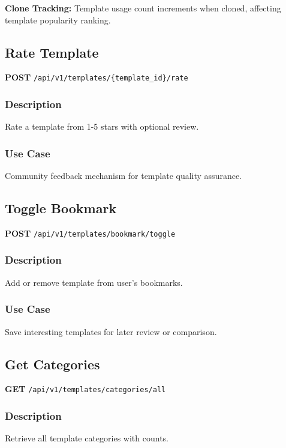 \documentclass[11pt,a4paper]{report}
\begin{document}
\begin{infobox}
\textbf{Clone Tracking:}
Template usage count increments when cloned, affecting template popularity ranking.
\end{infobox}

\subsection{Rate Template}

\textbf{POST} \texttt{/api/v1/templates/\{template\_id\}/rate}

\subsubsection{Description}
Rate a template from 1-5 stars with optional review.

\subsubsection{Use Case}
Community feedback mechanism for template quality assurance.

\subsection{Toggle Bookmark}

\textbf{POST} \texttt{/api/v1/templates/bookmark/toggle}

\subsubsection{Description}
Add or remove template from user's bookmarks.

\subsubsection{Use Case}
Save interesting templates for later review or comparison.

\subsection{Get Categories}

\textbf{GET} \texttt{/api/v1/templates/categories/all}

\subsubsection{Description}
Retrieve all template categories with counts.
\end{document}
